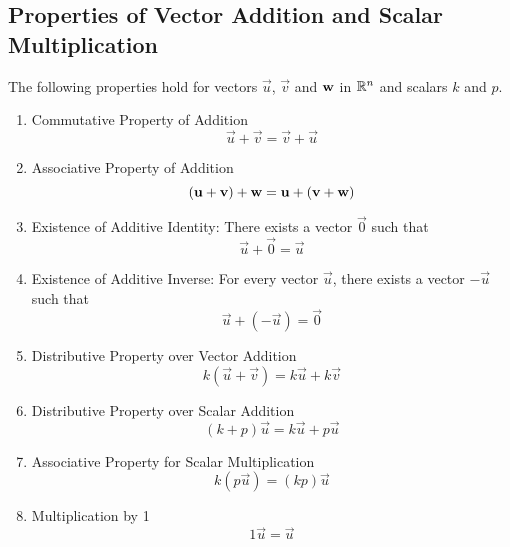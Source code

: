 \documentclass{ximera}
\begin{document}
\begin{center}
\end{center}
\subsection*{Properties of Vector Addition and Scalar Multiplication}
  \begin{theorem}\label{th:vecproperties} The following properties hold for vectors $\vec{u}$, $\vec{v}$ and ${\bf w}$ in $\RR^n$ and scalars $k$ and $p$.
  \begin{enumerate}
  \item \label{item:commvectoradd}
  Commutative Property of Addition
  $$\vec{u}+\vec{v}=\vec{v}+\vec{u}$$
  \item \label{item:assocvectoradd}
  Associative Property of Addition
  $$(\vec{u}+\vec{v})+{\bf w}=\vec{u}+(\vec{v}+{\bf w})$$
  \item \label{item:identityvectoradd}
  Existence of Additive Identity: There exists a vector $\vec{0}$ such that
  $$\vec{u}+\vec{0}=\vec{u}$$
  \item \label{item:inversevectoradd}
  Existence of Additive Inverse: For every vector $\vec{u}$, there exists a vector $-\vec{u}$ such that
  $$\vec{u}+(-\vec{u})=\vec{0}$$
  \item\label{item:distvectoradd}
  Distributive Property over Vector Addition
  $$k(\vec{u}+\vec{v})=k\vec{u}+k\vec{v}$$
  \item\label{item:distvectoradd2}
  Distributive Property over Scalar Addition
  $$(k+p)\vec{u}=k\vec{u}+p\vec{u}$$
  \item \label{item:assocvectorscalarmult}
  Associative Property for Scalar Multiplication
  $$k(p\vec{u})=(kp)\vec{u}$$
  \item \label{item:onevectorscalarmult}
  Multiplication by 1
  $$1\vec{u}=\vec{u}$$
  \end{enumerate}
\end{theorem}
\end{document}
